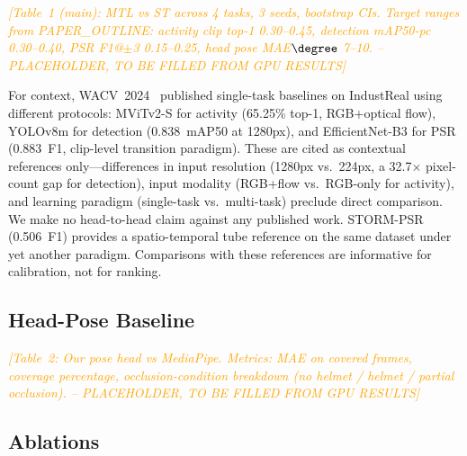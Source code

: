 \documentclass[conference]{IEEEtran}
\newcommand{\industreal}{IndustReal}
\newcommand{\resultplaceholder}[1]{\textcolor{orange}{\emph{[#1 -- PLACEHOLDER, TO BE FILLED FROM GPU RESULTS]}}}
\begin{document}
\resultplaceholder{Table~1 (main): MTL vs ST across 4 tasks, 3 seeds, bootstrap CIs. Target ranges from PAPER\_OUTLINE: activity clip top-1 0.30--0.45, detection mAP50-pc 0.30--0.40, PSR F1@$\pm$3 0.15--0.25, head pose MAE$\degree$ 7--10.}

\begin{table}[htbp]\centering\small
\caption{Target performance ranges (pre-experiment) from the experiment plan. Final values from 3-seed aggregate replace these at camera-ready.}
\label{tab:targets}
\end{table}

For context, WACV~2024~\cite{schoonbeek2024industreal} published single-task baselines on \industreal{} using different protocols: MViTv2-S for activity (65.25\% top-1, RGB+optical flow), YOLOv8m for detection (0.838~mAP50 at 1280px), and EfficientNet-B3 for PSR (0.883~F1, clip-level transition paradigm). These are cited as contextual references only---differences in input resolution (1280px vs.\ 224px, a 32.7$\times$ pixel-count gap for detection), input modality (RGB+flow vs.\ RGB-only for activity), and learning paradigm (single-task vs.\ multi-task) preclude direct comparison. We make no head-to-head claim against any published work. STORM-PSR~\cite{schoonbeek2025storm} (0.506~F1) provides a spatio-temporal tube reference on the same dataset under yet another paradigm. Comparisons with these references are informative for calibration, not for ranking.

\subsection{Head-Pose Baseline}
\label{sec:pose_baseline}

\resultplaceholder{Table~2: Our pose head vs MediaPipe. Metrics: MAE on covered frames, coverage percentage, occlusion-condition breakdown (no helmet / helmet / partial occlusion).}

\subsection{Ablations}
\label{sec:ablations}
\end{document}

